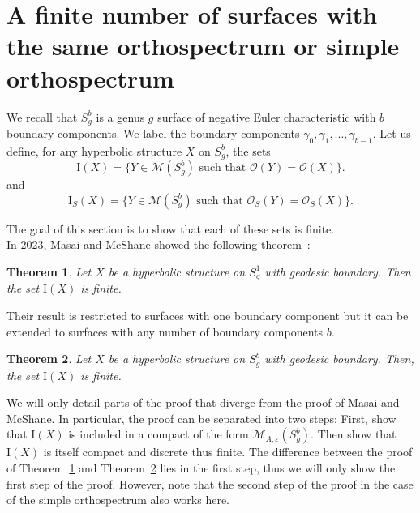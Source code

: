 \documentclass[a4paper,12pt]{article}
\newtheorem{theorem}{Theorem}[section]
\theoremstyle{definition}
\theoremstyle{remark}
\begin{document}





















\section{A finite number of surfaces with the same orthospectrum or simple orthospectrum}\label{sec:2}

We recall that $S_g^b$ is a genus $g$ surface of negative Euler characteristic with $b$ boundary components. We label the boundary components $\gamma_0, \gamma_1,...,\gamma_{b-1}$. Let us define, for any hyperbolic structure $X$ on $S_g^b$, the sets
\[
    \mathrm{I}(X)=\{ Y \in \mathcal{M}(S_g^b) \text{ such that } \mathcal{O}(Y)=\mathcal{O}(X) \}.
\] 
and
\[
    \mathrm{I}_S(X)=\{ Y \in \mathcal{M}(S_g^b) \text{ such that } \mathcal{O}_S(Y)=\mathcal{O}_S(X) \}.
\] 

The goal of this section is to show that each of these sets is finite.\\

In 2023, Masai and McShane showed the following theorem~\cite[Theorem~5.1]{orthoSys}:

\begin{theorem}\label{thm:OrthoFinite1}
    Let $X$ be a hyperbolic structure on $S_g^1$ with geodesic boundary. Then the set $\mathrm{I}(X)$ is finite.
\end{theorem}

Their result is restricted to surfaces with one boundary component but it can be extended to surfaces with any number of boundary components $b$.

\begin{theorem}\label{thm:OrthoFiniteb}
    Let $X$ be a hyperbolic structure on $S_g^b$ with geodesic boundary. Then, the set $\mathrm{I}(X)$ is finite.
\end{theorem}

We will only detail parts of the proof that diverge from the proof of Masai and McShane. In particular, the proof can be separated into two steps: First, show that $\mathrm{I}(X)$ is included in a compact of the form $\mathcal{M}_{A, \varepsilon}(S_g^b)$. Then show that $\mathrm{I}(X)$ is itself compact and discrete thus finite. The difference between the proof of Theorem~\ref{thm:OrthoFinite1} and Theorem~\ref{thm:OrthoFiniteb} lies in the first step, thus we will only show the first step of the proof. However, note that the second step of the proof in the case of the simple orthospectrum also works here.
\end{document}
